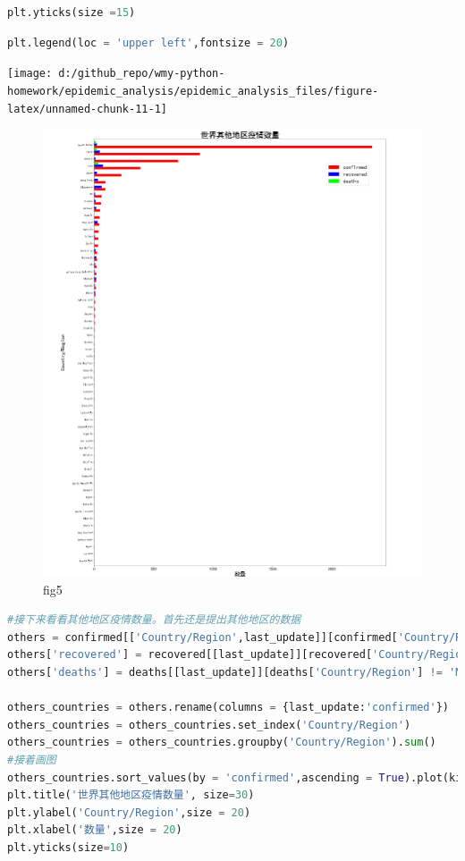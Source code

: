 \documentclass[UTF8,a4paper,12pt]{ctexart}  %
\begin{document}
\begin{lstlisting}[language=Python]
plt.yticks(size =15)
\end{lstlisting}

\begin{lstlisting}[language=Python]
plt.legend(loc = 'upper left',fontsize = 20)
\end{lstlisting}

\begin{center}\texttt{[image: d:/github\_repo/wmy-python-homework/epidemic\_analysis/epidemic\_analysis\_files/figure-latex/unnamed-chunk-11-1]} \end{center}

\begin{figure}
\centering
\includegraphics{./fig6.png}
\caption{fig5}
\end{figure}

\begin{lstlisting}[language=Python]
#接下来看看其他地区疫情数量。首先还是提出其他地区的数据
others = confirmed[['Country/Region',last_update]][confirmed['Country/Region'] != 'Mainland China']
others['recovered'] = recovered[[last_update]][recovered['Country/Region'] != 'Mainland China']
others['deaths'] = deaths[[last_update]][deaths['Country/Region'] != 'Mainland China']

others_countries = others.rename(columns = {last_update:'confirmed'})
others_countries = others_countries.set_index('Country/Region')
others_countries = others_countries.groupby('Country/Region').sum()
#接着画图
others_countries.sort_values(by = 'confirmed',ascending = True).plot(kind='barh',figsize=(20,30),color = ['red','blue','lime'], width=1,rot=2)
plt.title('世界其他地区疫情数量', size=30)
plt.ylabel('Country/Region',size = 20)
plt.xlabel('数量',size = 20)
plt.yticks(size=10)
\end{lstlisting}
\end{document}
